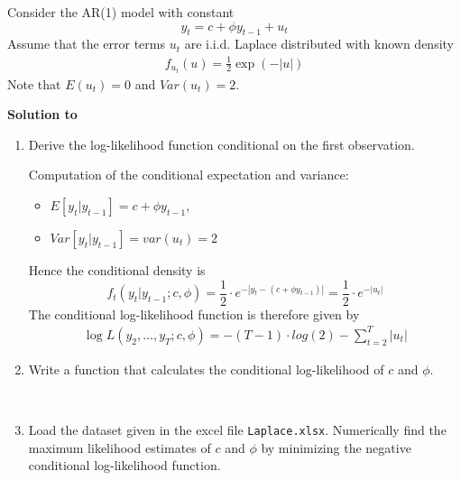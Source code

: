 Consider the AR(1) model with constant
$$ y_t = c + \phi y_{t-1} + u_t$$
Assume that the error terms $u_t$ are i.i.d. Laplace distributed with known density
\begin{align*}
    f_{u_{t}}(u)=\frac{1}{2}\exp \left( -|u|\right)
\end{align*}
Note that $E(u_t)=0$ and $Var(u_t)=2$.

\begin{solution}\textbf{Solution to }\end{solution}

\begin{enumerate}
    \item Derive the log-likelihood function conditional on the first observation.

          \begin{solution}
              Computation of the conditional expectation and variance:
              \begin{itemize}
                  \item $E[y_{t}|y_{t-1}] =
                            c + \phi y_{t-1} $,
                  \item $Var[y_{t}|y_{t-1}] = var(u_t) = 2$
              \end{itemize}
              Hence the conditional density is
              \begin{displaymath}
                  f_t(y_{t}|y_{t-1}; c, \phi) = \frac{1}{2} \cdot e^{-|y_{t} -(c + \phi y_{t-1})|} = \frac{1}{2} \cdot e^{-|u_t|}
              \end{displaymath}
              The conditional log-likelihood function is therefore given by
              \begin{eqnarray*}
                  \log L(y_{2}, \dots, y_{T};c, \phi)
                  =-(T-1) \cdot log(2) - \sum_{t=2}^{T} |u_{t}|
              \end{eqnarray*}
          \end{solution}

    \item Write a function that calculates the conditional log-likelihood of $c$ and $\phi$.

          \begin{solution}~
              
          \end{solution}

    \item Load the dataset given in the excel file \texttt{Laplace.xlsx}. Numerically find the maximum likelihood estimates of $c$ and $\phi$ by minimizing the negative conditional log-likelihood function.


\end{enumerate}
